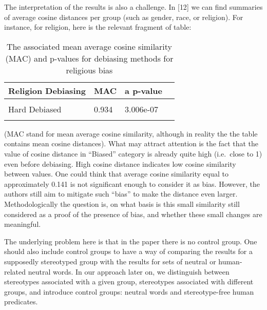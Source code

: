 \documentclass[
  10pt,
  dvipsnames,enabledeprecatedfontcommands]{scrartcl}
\begin{document}
The interpretation of the results is also a challenge. In {[}12{]} we
can find summaries of average cosine distances per group (such as
gender, race, or religion). For instance, for religion, here is the
relevant fragment of table:

\begin{table}
\footnotesize

\centering

\begin{tabular}[t]{lllr}
\toprule
Religion Debiasing & MAC & a p-value \\
\midrule
\cellcolor{gray!15}{Biased} & \cellcolor{gray!15}{0.859} & \cellcolor{gray!15}{N/A} \\
Hard Debiased & 0.934 & 3.006e-07\\
\cellcolor{gray!15}{Soft Debiased ($\lambda$ = 0.2)} & \cellcolor{gray!15}{0.894} & \cellcolor{gray!15}{0.007} \\
\bottomrule
\end{tabular}

\caption{The associated mean average cosine similarity
(MAC) and p-values for debiasing methods for religious bias}
\label{tab:religionOriginal2}
\normalsize 
\end{table}

\noindent (MAC stand for mean average cosine similarity, although in
reality the the table contains mean cosine distances). What may attract
attention is the fact that the value of cosine distance in ``Biased''
category is already quite high (i.e.~close to 1) even before debiasing.
High cosine distance indicates low cosine similarity between values. One
could think that average cosine similarity equal to approximately 0.141
is not significant enough to consider it as bias. However, the authors
still aim to mitigate such ``bias'' to make the distance even larger.
Methodologically the question is, on what basis is this small similarity
still considered as a proof of the presence of bias, and whether these
small changes are meaningful.

The underlying problem here is that in the paper there is no control
group. One should also include control groups to have a way of comparing
the results for a supposedly stereotyped group with the results for sets
of neutral or human-related neutral words. In our approach later on, we
distinguish between stereotypes associated with a given group,
stereotypes associated with different groups, and introduce control
groups: neutral words and stereotype-free human predicates.
\end{document}

